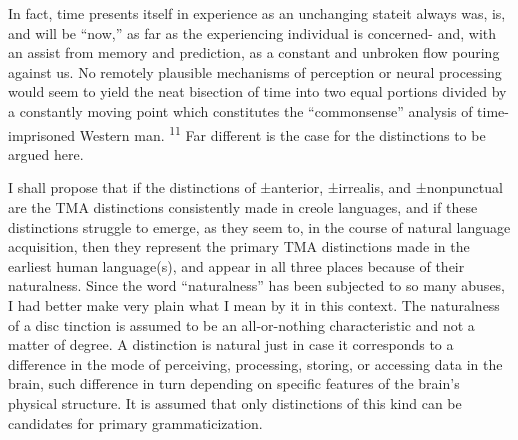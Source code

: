 In fact, time presents itself in experience as an unchanging state\-it always was, is, and will be ``now,'' as far as the experiencing indi\-vidual is concerned- and, with an assist from memory and prediction, as a constant and unbroken flow pouring against us. No remotely plausible mechanisms of perception or neural processing would seem to yield the neat bisection of time into two equal portions divided by a
constantly moving point which constitutes the ``commonsense'' analysis of time-imprisoned Western man. \textsuperscript{11} Far different is the case for the distinctions to be argued here.

I shall propose that if the distinctions of ±anterior, ±irrealis, and
±nonpunctual are the TMA distinctions consistently made in creole languages, and if these distinctions struggle to emerge, as they seem to, in the course of natural language acquisition, then they represent the primary TMA distinctions made in the earliest human language(s), and appear in all three places because of their naturalness. Since the word ``naturalness'' has been subjected to so many abuses, I had better make very plain what I mean by it in this context. The naturalness of a disc tinction is assumed to be an all-or-nothing characteristic and not a matter of degree. A distinction is natural just in case it corresponds to a difference in the mode of perceiving, processing, storing, or access\-ing data in the brain, such difference in turn depending on specific features of the brain's physical structure. It is assumed that only dis\-tinctions of this kind can be candidates for primary grammaticization.


